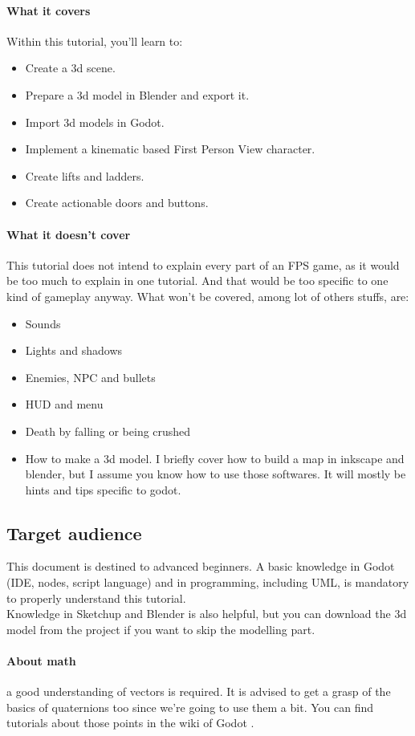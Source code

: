 \documentclass[10pt,a4paper]{article}
\begin{document}
\paragraph{What it covers} 
Within this tutorial, you'll learn to:
\begin{itemize}
\item Create a 3d scene.
\item Prepare a 3d model in Blender and export it.
\item Import 3d models in Godot.
\item Implement a kinematic based First Person View character.
\item Create lifts and ladders.
\item Create actionable doors and buttons.
\end{itemize}

\paragraph{What it doesn't cover}
This tutorial does not intend to explain every part of an FPS game, as it would be too much to explain in one tutorial. And that would be too specific to one kind of gameplay anyway. What won't be covered, among lot of others stuffs, are:
\begin{itemize}
\item Sounds
\item Lights and shadows
\item Enemies, NPC and bullets
\item HUD and menu
\item Death by falling or being crushed
\item How to make a 3d model. I briefly cover how to build a map in inkscape and blender, but I assume you know how to use those softwares. It will mostly be hints and tips specific to godot.
\end{itemize}

\subsection{Target audience}
This document is destined to advanced beginners. A basic knowledge in Godot (IDE, nodes, script language) and in programming, including UML, is mandatory to properly understand this tutorial. \\
Knowledge in Sketchup and Blender is also helpful, but you can download the 3d model from the project if you want to skip the modelling part.
\paragraph{About math} a good understanding of vectors is required. It is advised to get a grasp of the basics of quaternions too since we're going to use them a bit. You can find tutorials about those points in the wiki of Godot \cite{wiki_godot}.
\end{document}
